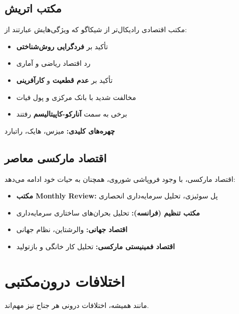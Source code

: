 \subsection{مکتب اتریش}

\begin{defbox}
مکتب اقتصادی رادیکال‌تر از شیکاگو که ویژگی‌هایش عبارتند از:
\begin{itemize}[nosep]
    \item تأکید بر \textbf{فردگرایی روش‌شناختی}
    \item رد اقتصاد ریاضی و آماری
    \item تأکید بر \textbf{عدم قطعیت} و \textbf{کارآفرینی}
    \item مخالفت شدید با بانک مرکزی و پول فیات
    \item برخی به سمت \textbf{آنارکو-کاپیتالیسم} رفتند
\end{itemize}
\textbf{چهره‌های کلیدی:} میزس، هایک، راتبارد
\end{defbox}

\subsection{اقتصاد مارکسی معاصر}

اقتصاد مارکسی، با وجود فروپاشی شوروی، همچنان به حیات خود ادامه می‌دهد:

\begin{itemize}[nosep, rightmargin=1.5cm]
    \item \textbf{مکتب Monthly Review:} پل سوئیزی، تحلیل سرمایه‌داری انحصاری
    \item \textbf{مکتب تنظیم (فرانسه):} تحلیل بحران‌های ساختاری سرمایه‌داری
    \item \textbf{اقتصاد جهانی:} والرشتاین، نظام جهانی
    \item \textbf{اقتصاد فمینیستی مارکسی:} تحلیل کار خانگی و بازتولید
\end{itemize}

\section{اختلافات درون‌مکتبی}

مانند همیشه، اختلافات درونی هر جناح نیز مهم‌اند.

